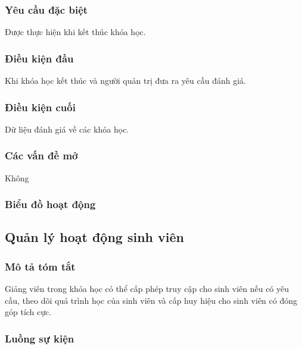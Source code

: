 \documentclass[./../main_file.tex]{subfiles}
\begin{document}
\subsubsection{Yêu cầu đặc biệt}
Được thực hiện khi kết thúc khóa học.

\subsubsection{Điều kiện đầu}
Khi khóa học kết thúc và người quản trị đưa ra yêu cầu đánh giá.

\subsubsection{Điều kiện cuối}
Dữ liệu đánh giá về các khóa học.

\subsubsection{Các vấn đề mở}
Không

\subsubsection{Biểu đồ hoạt động}

\subsection{Quản lý hoạt động sinh viên}
\subsubsection{Mô tả tóm tắt}
Giảng viên trong khóa học có thể cấp phép truy cập cho sinh viên nếu có yêu cầu, theo dõi quá trình học của sinh viên và cấp huy hiệu cho sinh viên có đóng góp tích cực.

\subsubsection{Luồng sự kiện}
\end{document}
